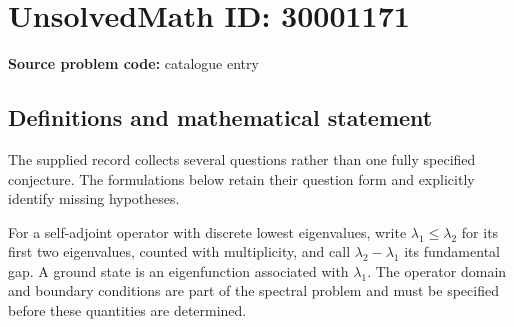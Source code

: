 \documentclass[11pt]{article}
\begin{document}
\section*{UnsolvedMath ID: 30001171}
\textbf{Source problem code:} catalogue entry
\subsection{Definitions and mathematical statement}
The supplied record collects several questions rather than one fully specified conjecture. The formulations below retain their question form and explicitly identify missing hypotheses.

For a self-adjoint operator with discrete lowest eigenvalues, write \(\lambda_1\leq\lambda_2\) for its first two eigenvalues, counted with multiplicity, and call \(\lambda_2-\lambda_1\) its fundamental gap. A ground state is an eigenfunction associated with \(\lambda_1\). The operator domain and boundary conditions are part of the spectral problem and must be specified before these quantities are determined.
\end{document}
